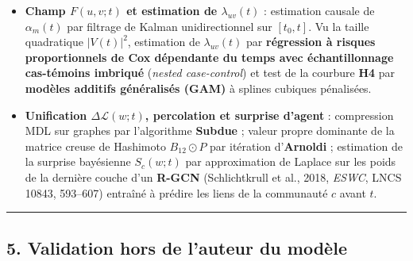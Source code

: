 \documentclass[a4paper,11pt]{article}
\providecommand{\tightlist}{\setlength{\itemsep}{0pt}\setlength{\parskip}{0pt}}
\begin{document}
\begin{itemize}
  \begin{itemize}
  \tightlist
  \item
    \emph{Régime exact} (\(|V_u| \le 25\), choix d'ingénierie) :
    formulation du maximum de \(\kappa(\phi) - \gamma' \chi(\phi)\) en
    programmation linéaire en nombres entiers mixtes (\textbf{MILP})
    résolue par \textbf{CP-SAT (Google OR-Tools)}.
  \item
    \emph{Passage à l'échelle} : transport optimal structuré
    \textbf{Fused Gromov-Wasserstein (FGW)} (Vayer, Chapel, Flamary,
    Tavenard, \& Courty, 2020, \emph{Algorithms}, 13(9), 212) via la
    bibliothèque \textbf{POT}, en définissant la matrice de coût
    exclusivement sur les types d'arêtes abstraits \(\pi(r)\) et les
    pénalités d'incompatibilité \(\mathcal{I}\), \emph{sans aucun accès
    aux étiquettes lexicales des nœuds}.
  \end{itemize}
\item
  \textbf{Champ \(F(u,v;t)\) et estimation de \(\lambda_{uv}(t)\)} :
  estimation causale de \(\alpha_m(t)\) par filtrage de Kalman
  unidirectionnel sur \([t_0, t]\). Vu la taille quadratique
  \(|V(t)|^2\), estimation de \(\lambda_{uv}(t)\) par \textbf{régression
  à risques proportionnels de Cox dépendante du temps avec
  échantillonnage cas-témoins imbriqué} (\emph{nested case-control}) et
  test de la courbure \textbf{H4} par \textbf{modèles additifs
  généralisés (GAM)} à splines cubiques pénalisées.
\item
  \textbf{Unification \(\Delta \mathcal{L}(w;t)\), percolation et
  surprise d'agent} : compression MDL sur graphes par l'algorithme
  \textbf{Subdue} ; valeur propre dominante de la matrice creuse de
  Hashimoto \(B_{12} \odot P\) par itération d'\textbf{Arnoldi} ;
  estimation de la surprise bayésienne \(S_c(w;t)\) par approximation de
  Laplace sur les poids de la dernière couche d'un \textbf{R-GCN}
  (Schlichtkrull et al., 2018, \emph{ESWC}, LNCS 10843, 593--607)
  entraîné à prédire les liens de la communauté \(c\) avant \(t\).
\end{itemize}

\begin{center}\rule{0.5\linewidth}{0.5pt}\end{center}

\subsection*{5. Validation hors de l'auteur du modèle}
\end{document}
